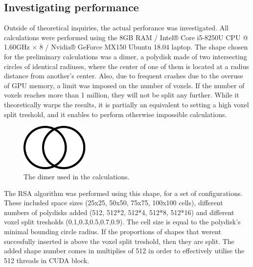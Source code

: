 \documentclass[12pt, oneside]{report}
\begin{document}
\subsection{Investigating performance}

Outside of theoretical inquiries, the actual perforance was investigated. All calculations were performed using the 8GB RAM / Intel® Core i5-8250U CPU @ 1.60GHz × 8 / Nvidia® GeForce MX150 Ubuntu 18.04 laptop. The shape chosen for the preliminary calculations was a dimer, a polydisk made of two intersecting circles of identical radiuses, where the center of one of them is located at a radius distance from another's center. Also, due to frequent crashes due to the overuse of GPU memory, a limit was imposed on the number of voxels. If the number of voxels reaches more than 1 million, they will not be split any further. While it theoretically warps the results, it is partially an equivalent to setting a high voxel split treshold, and it enables to perform otherwise impossible calculations.

\begin{figure}[H]
  \centering
	\label{summary_dimer}
	\includegraphics[width=0.3\textwidth,keepaspectratio]{Images/SummaryOptimisation/dimer.pdf}
	\caption{The dimer used in the calculations.}
\end{figure}
The RSA algorithm was performed using this shape, for a set of configurations. These included space sizes (25x25, 50x50, 75x75, 100x100 cells), different numbers of polydisks added (512, 512*2, 512*4, 512*8, 512*16) and different voxel split tresholds (0.1,0.3,0.5,0.7,0.9). The cell size is equal to the polydisk's minimal bounding circle radius.
If the proportions of shapes that werent succesfully inserted is above the voxel split treshold, then they are split. The added shape number comes in multiplies of 512 in order to effectively utilise the 512 threads in CUDA block.
\end{document}
